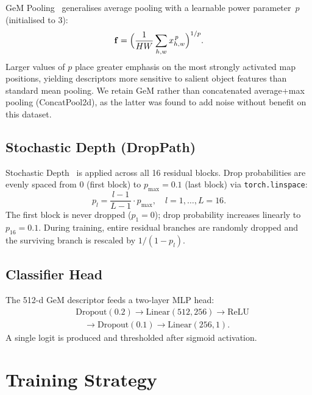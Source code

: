 \documentclass{article}
\theoremstyle{plain}
\theoremstyle{definition}
\theoremstyle{remark}
\begin{document}
GeM Pooling~\cite{Radenovic2018} generalises average pooling with a
learnable power parameter~$p$ (initialised to 3):
\begin{equation}
  \mathbf{f} = \Bigl(\frac{1}{HW}
    \sum_{h,w} x_{h,w}^{\,p}\Bigr)^{1/p}.
\end{equation}
Larger values of $p$ place greater emphasis on the most strongly
activated map positions, yielding descriptors more sensitive to salient
object features than standard mean pooling.  We retain GeM rather than
concatenated average+max pooling (ConcatPool2d), as the latter was
found to add noise without benefit on this dataset.

\subsection{Stochastic Depth (DropPath)}

Stochastic Depth~\cite{Huang2016} is applied across all 16 residual
blocks.  Drop probabilities are evenly spaced from 0 (first block) to
$p_{\max} = 0.1$ (last block) via \texttt{torch.linspace}:
\begin{equation}
  p_l = \frac{l-1}{L-1}\cdot p_{\max}, \quad l = 1,\ldots,L=16.
\end{equation}
The first block is never dropped ($p_1=0$); drop probability increases
linearly to $p_{16}=0.1$.  During training, entire residual branches
are randomly dropped and the surviving branch is rescaled by
$1/(1-p_l)$.

\subsection{Classifier Head}

The 512-d GeM descriptor feeds a two-layer MLP head:
\begin{align*}
  &\mathrm{Dropout}(0.2) \to \mathrm{Linear}(512, 256) \to \mathrm{ReLU} \\
  &\quad\to \mathrm{Dropout}(0.1) \to \mathrm{Linear}(256, 1).
\end{align*}
A single logit is produced and thresholded after sigmoid activation.

\section{Training Strategy}
\label{sec:training}
\end{document}
